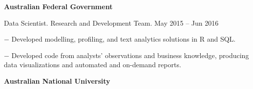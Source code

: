 \documentclass[10pt]{article}
\newcommand{\halfblankline}{\quad\vspace{-0.5\baselineskip}\pagebreak[3]}
\begin{document}

\halfblankline

\halfblankline

\textbf{Australian Federal Government}

\halfblankline

\begin{innerlist}
	\item Data Scientist. Research and Development Team. \hfill {May 2015 -- Jun 2016}
	\begin{innerlist}
		\item[$-$] Developed modelling, profiling, and text analytics solutions in R and SQL.
		\item[$-$] Developed code from analysts' observations and business knowledge, producing data visualizations and automated and on-demand reports.
    \end{innerlist}
\end{innerlist}

\halfblankline

\halfblankline

\textbf{Australian National University}

\halfblankline
\end{document}

